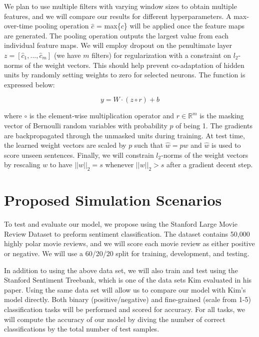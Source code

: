 \documentclass[conference]{IEEEtran}
\begin{document}
      We plan to use multiple filters with varying window sizes to obtain multiple features, and we will
      compare our results for different hyperparameters.
      A max-over-time pooling operation $\hat{c}$ = max\{$c$\} will be applied once the feature
      maps are generated. The pooling operation outputs the largest value from each individual
      feature maps. We will employ dropout on the penultimate layer $z = [\hat{c}_1,...,\hat{c}_m]$
      (we have $m$ filters) for regularization with a constraint on $l_2$-norms of the weight
      vectors. This should help prevent co-adaptation of hidden units by randomly setting weights
      to zero for selected neurons. The function is expressed below:

      \begin{equation}
       y = W \cdot (z \circ r) + b
      \end{equation}

      where $\circ$ is the element-wise multiplication operator and $r \in \mathbb{R}^m$ is
      the masking vector of Bernoulli random variables with probability $p$ of being 1.
      The gradients are backpropagated through the unmasked units during training. At test
      time, the learned weight vectors are scaled by $p$ such that $\hat{w} = pw$ and $\hat{w}$
      is used to score unseen sentences. Finally, we will constrain $l_2$-norms of the weight
      vectors by rescaling $w$ to have $||w||_2 = s$ whenever $||w||_2 > s$ after a gradient
      decent step.

\section{Proposed Simulation Scenarios}
      To test and evaluate our model, we propose using the Stanford Large Movie Review
      Dataset to preform sentiment classification\cite{maas-EtAl:2011:ACL-HLT2011}.
      The dataset contains 50,000 highly polar
      movie reviews, and we will score each movie review as either positive or
      negative. We will use a 60/20/20 split for training, development, and testing.

      In addition to using the above data set, we will also train and test using the Stanford Sentiment
      Treebank, which is one of the data sets Kim evaluated in his paper\cite{sentimenttreebank}.
      Using the same data set
      will allow us to compare our model with Kim's model directly. Both binary (positive/negative)
      and fine-grained (scale from 1-5) classification tasks will be performed and scored for accuracy.
      For all tasks, we will compute the accuracy of our model by diving the number of correct classifications
      by the total number of test samples.
\end{document}
